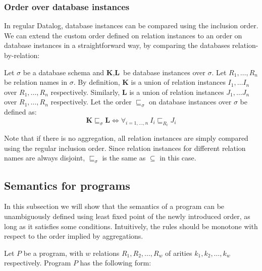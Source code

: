 \subsubsection{Order over database instances}

In regular Datalog, database instances can be compared using the inclusion order. We can extend the custom order defined on relation instances to an order on database instances in a straightforward way, by comparing the databases relation-by-relation:

\begin{defn}
Let $\sigma$ be a database schema and $\textbf{K}, \textbf{L}$ be database instances over $\sigma$. Let $R_1, \dots, R_n$ be relation names in $\sigma$. By definition, $\textbf{K}$ is a union of relation instances $I_1, \dots I_n$ over $R_1, \dots, R_n$ respectively. Similarly, $\textbf{L}$ is a union of relation instances $J_1, \dots J_n$ over $R_1, \dots, R_n$ respectively.  Let the order $\sqsubseteq_\sigma$ on database instances over $\sigma$ be defined as:
$$\textbf{K} \sqsubseteq_\sigma \textbf{L} \iff \forall_{i=1, \dots, n}~I_i \sqsubseteq_{R_i} J_i$$
\end{defn}

\begin{rem}
Note that if there is no aggregation, all relation instances are simply compared using the regular inclusion order. Since relation instances for different relation names are always disjoint, $\sqsubseteq_\sigma$ is the same as $\subseteq$ in this case.
\end{rem}

\subsection{Semantics for \datalogra programs}\label{ss:semdra}
In this subsection we will show that the semantics of a \datalogra program can be unambiguously defined using least fixed point of the newly introduced order, as long as it satisfies some conditions. Intuitively, the rules should be monotone with respect to the order implied by aggregations. 


Let $P$ be a \datalogra program, with $w$ \idb relations $R_1, R_2, \dots, R_w$ of arities $k_1, k_2, \dots, k_w$ respectively. Program $P$ has the following form:

